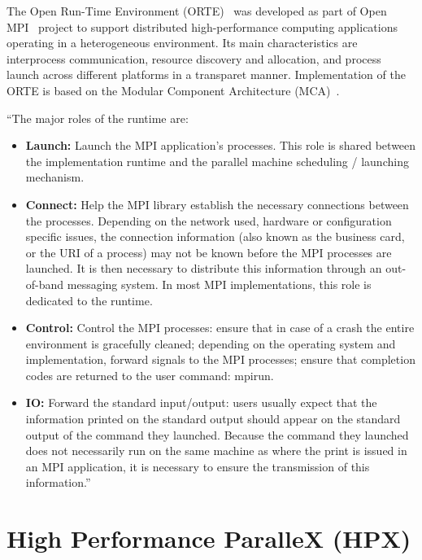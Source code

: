 The Open Run-Time Environment (ORTE)~\cite{Castain2008153} was developed as part of Open MPI~\cite{gabriel04:_open_mpi} project to support distributed high-performance computing applications operating in a heterogeneous environment. Its main characteristics are interprocess communication, resource discovery and allocation, and process launch across different platforms in a transparet manner. Implementation of the ORTE is based on the Modular Component Architecture (MCA)~\cite{gabriel04:_open_mpi}.

``The major roles of the runtime are:
\begin{itemize}
\item \textbf{Launch:} Launch the MPI application’s processes. This role is shared between the implementation runtime and the parallel machine scheduling / launching mechanism.
\item \textbf{Connect:} Help the MPI library establish the necessary connections between the processes. Depending on the network used, hardware or configuration specific issues, the connection information (also known as the business card, or the URI of
a process) may not be known before the MPI processes are launched. It is then necessary to distribute this information through an out-of-band messaging system. In most MPI implementations, this role is dedicated to the runtime.
\item \textbf{Control:} Control the MPI processes: ensure that in case of a crash the entire environment is gracefully cleaned; depending on the operating system and implementation, forward signals to the MPI processes; ensure that completion codes
are returned to the user command: mpirun.
\item \textbf{IO:} Forward the standard input/output: users usually expect that the information printed on the standard output should appear on the standard output of the command they launched. Because the command they launched does not necessarily run on the same machine as where the print is issued in an MPI application, it is necessary to ensure the transmission of this information.''~\cite{bosilca2011scalability}
\end{itemize}

\section{High Performance ParalleX (HPX)}
\label{sec:Background}




